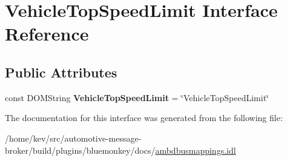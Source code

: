 \hypertarget{interfaceVehicleTopSpeedLimit}{\section{Vehicle\+Top\+Speed\+Limit Interface Reference}
\label{interfaceVehicleTopSpeedLimit}
}
\subsection*{Public Attributes}
\begin{DoxyCompactItemize}
\item 
\hypertarget{interfaceVehicleTopSpeedLimit_a7bb5157a2806dc1486150162b0036fad}{const D\+O\+M\+String {\bfseries Vehicle\+Top\+Speed\+Limit} = \char`\"{}Vehicle\+Top\+Speed\+Limit\char`\"{}}\label{interfaceVehicleTopSpeedLimit_a7bb5157a2806dc1486150162b0036fad}

\end{DoxyCompactItemize}


The documentation for this interface was generated from the following file\+:\begin{DoxyCompactItemize}
\item 
/home/kev/src/automotive-\/message-\/broker/build/plugins/bluemonkey/docs/\hyperlink{ambdbusmappings_8idl}{ambdbusmappings.\+idl}\end{DoxyCompactItemize}
